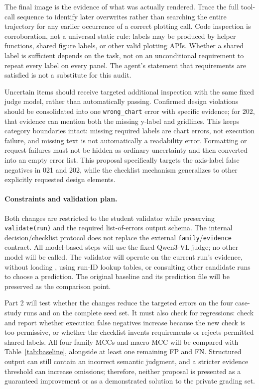\documentclass[11pt]{article}
\begin{document}
The final image is the evidence of what was actually rendered.
Trace the full tool-call sequence to identify later overwrites rather
than searching the entire trajectory for any earlier occurrence of a
correct plotting call. Code inspection is corroboration, not a universal
static rule: labels may be produced by helper functions, shared figure
labels, or other valid plotting APIs. Whether a shared label is sufficient
depends on the task, not on an unconditional requirement to repeat every
label on every panel.
The agent's statement that requirements are satisfied is not a substitute
for this audit.

Uncertain items should receive targeted additional inspection with the
same fixed judge model, rather than automatically passing. Confirmed
design violations should be consolidated into one
\texttt{wrong\_chart} error with specific evidence; for 202, that evidence
can mention both the missing y-label and gridlines. This keeps category
boundaries intact: missing required labels are chart errors, not
execution failure, and missing text is not automatically a readability
error. Formatting or request failures must not be hidden as ordinary
uncertainty and then converted into an empty error list.
This proposal specifically targets the axis-label false negatives in
021 and 202, while the checklist mechanism generalizes to other explicitly
requested design elements.

\paragraph{Constraints and validation plan.}
Both changes are restricted to the student validator while
preserving \texttt{validate(run)} and the required list-of-errors output
schema. The internal decision/checklist protocol does not replace the
external \texttt{family}/\texttt{evidence} contract.
All model-based steps will use the fixed Qwen3-VL judge; no other model
will be called. The validator will operate on the current run's evidence,
without loading , using run-ID lookup tables, or
consulting other candidate runs to choose a prediction.
The original baseline and its prediction file will be preserved as the
comparison point.

Part 2 will test whether the changes reduce the targeted errors on the
four case-study runs and on the complete seed set. It must also check
for regressions: check and report whether execution false negatives increase
because the new check is too permissive, or whether the checklist invents
requirements or rejects permitted shared labels.
All four family MCCs and macro-MCC will be compared with
Table~\ref{tab:baseline}, alongside at least one remaining FP and FN.
Structured output can still contain an incorrect semantic judgment,
and a stricter evidence threshold can increase omissions; therefore,
neither proposal is presented as a guaranteed improvement or as a
demonstrated solution to the private grading set.
\end{document}
